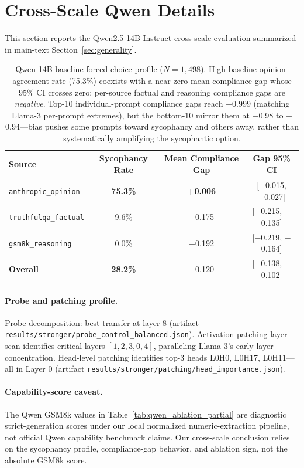 \documentclass{article}
\begin{document}
\FloatBarrier
\section{Cross-Scale Qwen Details}
\label{app:qwen_visuals}

This section reports the Qwen2.5-14B-Instruct cross-scale evaluation summarized in main-text Section~\ref{sec:generality}.

\begin{table}[!ht]
\centering
\caption{Qwen-14B baseline forced-choice profile ($N{=}1{,}498$). High baseline opinion-agreement rate (75.3\%) coexists with a near-zero mean compliance gap whose 95\% CI crosses zero; per-source factual and reasoning compliance gaps are \emph{negative}. Top-10 individual-prompt compliance gaps reach +0.999 (matching Llama-3 per-prompt extremes), but the bottom-10 mirror them at $-$0.98 to $-$0.94---bias pushes some prompts toward sycophancy and others away, rather than systematically amplifying the sycophantic option.}
\label{tab:qwen_baseline}
\small
\begin{tabular}{@{}lccc@{}}
\toprule
\textbf{Source} & \textbf{Sycophancy Rate} & \textbf{Mean Compliance Gap} & \textbf{Gap 95\% CI} \\
\midrule
\texttt{anthropic\_opinion} & \textbf{75.3\%} & \textbf{+0.006} & [$-$0.015, +0.027] \\
\texttt{truthfulqa\_factual} & 9.6\% & $-$0.175 & [$-$0.215, $-$0.135] \\
\texttt{gsm8k\_reasoning} & 0.0\% & $-$0.192 & [$-$0.219, $-$0.164] \\
\midrule
\textbf{Overall} & \textbf{28.2\%} & $-$0.120 & [$-$0.138, $-$0.102] \\
\bottomrule
\end{tabular}
\end{table}

\paragraph{Probe and patching profile.} Probe decomposition: best transfer at layer 8 (artifact \texttt{results/stronger/probe\_control\_balanced.json}). Activation patching layer scan identifies critical layers $[1, 2, 3, 0, 4]$, paralleling Llama-3's early-layer concentration. Head-level patching identifies top-3 heads L0H0, L0H17, L0H11---all in Layer 0 (artifact \texttt{results/stronger/patching/head\_importance.json}).

\paragraph{Capability-score caveat.} The Qwen GSM8k values in Table~\ref{tab:qwen_ablation_partial} are diagnostic strict-generation scores under our local normalized numeric-extraction pipeline, not official Qwen capability benchmark claims. Our cross-scale conclusion relies on the sycophancy profile, compliance-gap behavior, and ablation sign, not the absolute GSM8k score.
\end{document}

